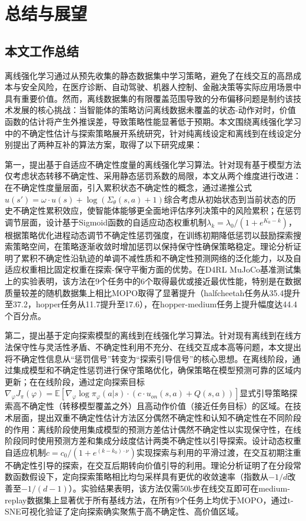 \chapter{总结与展望}\label{Chap:chap5}

\section{本文工作总结}\label{Sec5.1}

离线强化学习通过从预先收集的静态数据集中学习策略，避免了在线交互的高昂成本与安全风险，在医疗诊断、自动驾驶、机器人控制、金融决策等实际应用场景中具有重要价值。然而，离线数据集的有限覆盖范围导致的分布偏移问题是制约该技术发展的核心挑战：当智能体的策略访问离线数据未覆盖的状态-动作对时，价值函数的估计将产生外推误差，导致策略性能显著低于预期。本文围绕离线强化学习中的不确定性估计与探索策略展开系统研究，针对纯离线设定和离线到在线设定分别提出了两种互补的算法方案，取得了以下研究成果：

第一，提出基于自适应不确定性度量的离线强化学习算法。针对现有基于模型方法仅考虑状态转移不确定性、采用静态惩罚系数的局限，本文从两个维度进行改进：在不确定性度量层面，引入累积状态不确定性的概念，通过递推公式$u(s') = \omega \cdot u(s) + \log(\Sigma_\theta(s, a) + 1)$综合考虑从初始状态到当前状态的历史不确定性累积效应，使智能体能够更全面地评估序列决策中的风险累积；在惩罚调节层面，设计基于Sigmoid函数的自适应动态权重机制$\lambda_k = \lambda_0 / (1 + e^{K_0 - k})$，根据策略优化进程动态调节不确定性惩罚强度，在训练初期降低惩罚以鼓励探索搜索策略空间，在策略逐渐收敛时增加惩罚以保持保守性确保策略稳定。理论分析证明了累积不确定性沿轨迹的单调不减性质和不确定性预测网络的泛化能力，以及自适应权重相比固定权重在探索-保守平衡方面的优势。在D4RL MuJoCo基准测试集上的实验表明，该方法在9个任务中的6个取得最优或接近最优性能，特别是在数据质量较差的随机数据集上相比MOPO取得了显著提升（halfcheetah任务从35.4提升至37.2，hopper任务从11.7提升至17.6），在hopper-medium任务上提升幅度达44.4个百分点。

第二，提出基于定向探索模型的离线到在线强化学习算法。针对现有离线到在线方法保守性与灵活性矛盾、不确定性利用不充分、在线交互成本高等问题，本文提出将不确定性信息从“惩罚信号”转变为“探索引导信号”的核心思想。在离线阶段，通过集成模型和不确定性惩罚进行保守策略优化，确保策略在模型预测可靠的区域内更新；在在线阶段，通过定向探索目标$\nabla_\varphi J_\pi(\varphi) = \mathbb{E}[\nabla_\varphi \log \pi_\varphi(a|s) \cdot (c \cdot u_{on}(s, a) + Q(s, a))]$显式引导策略探索高不确定性（转移模型覆盖之外）且高动作价值（接近任务目标）的区域。在技术层面，提出双重不确定性估计方法区分偶然不确定性和认知不确定性在不同阶段的作用：离线阶段使用集成模型的预测方差估计偶然不确定性以实现保守性，在线阶段同时使用预测方差和集成分歧度估计两类不确定性以引导探索。设计动态权重自适应机制$c = c_0 / (1 + e^{(k - k_0) \cdot \nu})$实现探索与利用的平滑过渡，在交互初期注重不确定性引导的探索，在交互后期转向价值引导的利用。理论分析证明了在分段常数函数假设下，定向探索策略相比均匀采样具有更优的收敛速率（指数从$-1/d$改善至$-1/(d-1)$）。实验结果表明，该方法仅需50k步在线交互即可在medium-replay数据集上显著优于所有基线方法，在所有9个任务上均优于MOPO，通过t-SNE可视化验证了定向探索确实聚焦于高不确定性、高价值区域。

